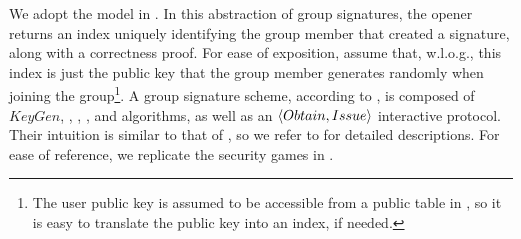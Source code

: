 We adopt the model in \cite{bsz05}. In this abstraction
of group signatures, the opener returns an index uniquely identifying the group
member that created a signature, along with a correctness proof. For ease of
exposition, assume that, w.l.o.g., this index is just the public key that the
group member generates randomly when joining the group\footnote{The user public
  key is assumed to be accessible from a public table in \cite{bsz05}, so it is
  easy to translate the public key into an index, if needed.}. A group signature
scheme, according to \cite{bsz05}, is composed of $KeyGen$, \UKeyGen, \Sign,
\Verify, \Open and \Judge algorithms, as well as an $\langle Obtain,Issue
\rangle$ interactive protocol. Their intuition is similar to that of
\UAS, so we refer to \cite{bsz05} for detailed descriptions. For ease of
reference, we replicate the security games in .

